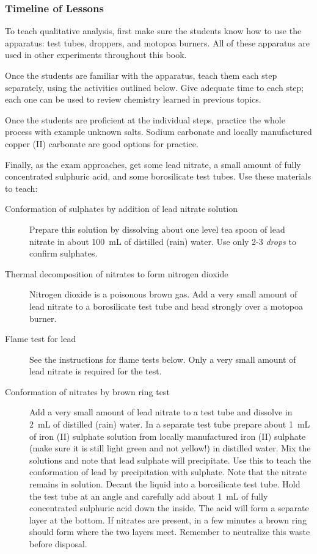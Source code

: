 \subsubsection{Timeline of Lessons}

To teach qualitative analysis, first make sure the students know how to use the apparatus: test tubes, droppers, and motopoa burners. All of these apparatus are used in other experiments throughout this book.

Once the students are familiar with the apparatus, teach them each step separately, using the activities outlined below. Give adequate time to each step; each one can be used to review chemistry learned in previous topics.

Once the students are proficient at the individual steps, practice the whole process with example unknown salts. Sodium carbonate and locally manufactured copper (II) carbonate are good options for practice.

Finally, as the exam approaches, get some lead nitrate, a small amount of fully concentrated sulphuric acid, and some borosilicate test tubes. Use these materials to teach:
\begin{description}
\item[Conformation of sulphates by addition of lead nitrate solution]{Prepare this solution by dissolving about one level tea spoon of lead nitrate in about 100~mL of distilled (rain) water. Use only 2-3 \textit{drops} to confirm sulphates.}
\item[Thermal decomposition of nitrates to form nitrogen dioxide]{Nitrogen dioxide is a poisonous brown gas. Add a very small amount of lead nitrate to a borosilicate test tube and head strongly over a motopoa burner.}
\item[Flame test for lead]{See the instructions for flame tests below. Only a very small amount of lead nitrate is required for the test.}
\item[Conformation of nitrates by brown ring test]{Add a very small amount of lead nitrate to a test tube and dissolve in 2~mL of distilled (rain) water. In a separate test tube prepare about 1~mL of iron (II) sulphate solution from locally manufactured iron (II) sulphate (make sure it is still light green and not yellow!) in distilled water. Mix the solutions and note that lead sulphate will precipitate. Use this to teach the conformation of lead by precipitation with sulphate. Note that the nitrate remains in solution. Decant the liquid into a borosilicate test tube. Hold the test tube at an angle and carefully add about 1~mL of fully concentrated sulphuric acid down the inside. The acid will form a separate layer at the bottom. If nitrates are present, in a few minutes a brown ring should form where the two layers meet. Remember to neutralize this waste before disposal.}
\end{description}

